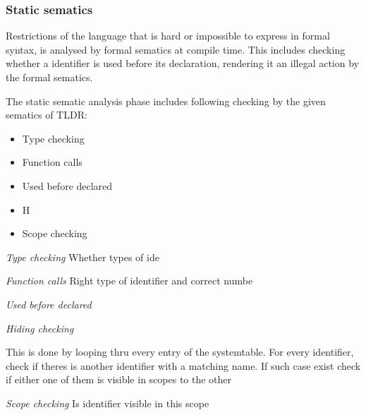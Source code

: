 \subsubsection{Static sematics}

Restrictions of the language that is hard or impossible to express in formal syntax, is analysed by formal sematics at compile time. This includes checking whether a identifier is used before its declaration, rendering it an illegal action by the formal sematics. 

The static sematic analysis phase includes following checking by the given sematics of TLDR:
\begin{itemize}
\item Type checking 
\item Function calls
\item Used before declared
\item H%
\item Scope checking
\end{itemize}

\emph{Type checking}
  Whether types of ide%
  
\emph{Function calls}
  Right type of identifier and correct numbe%

\emph{Used before declared}
  
  
  
\emph{Hiding checking}
  
  This is done by looping thru every entry of the systemtable. For every identifier, check if theres is another identifier with a matching name. If such case exist check if either one of them is visible in scopes to the other

\emph{Scope checking}
  Is identifier visible in this scope
